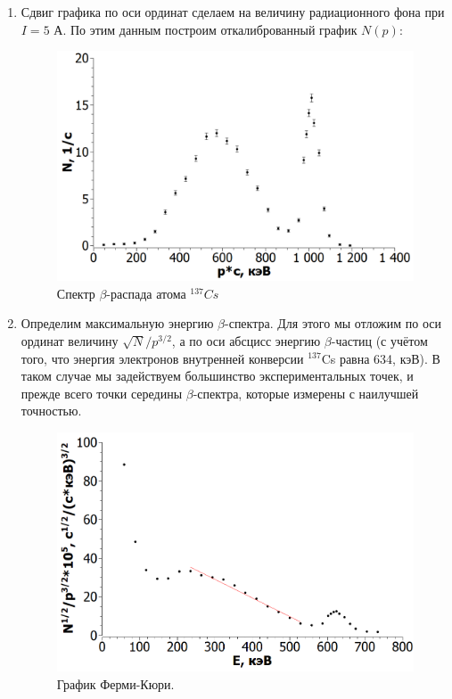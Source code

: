 \documentclass[a4paper, 12pt]{article}%
\begin{document}
\begin{enumerate}
\item Сдвиг графика по оси ординат сделаем на величину радиационного фона при $I = 5$ А. По этим данным построим откалиброванный график $N(p)$:

\begin{figure}[h]
    \centering
    \includegraphics[width=0.8\linewidth]{graph_2.PNG}
    \caption{Спектр $\beta$-распада атома $^{137}Cs$}
    \label{fig:graph_2}
\end{figure}

\item Определим максимальную энергию $\beta$-спектра. Для этого мы отложим по оси ординат величину $\sqrt{N}/p^{3/2}$, а по оси абсцисс энергию $\beta$-частиц (с учётом того, что энергия электронов внутренней конверсии $^{137}$Cs равна 634, кэВ). В таком случае мы задействуем большинство экспериментальных точек, и прежде всего точки середины $\beta$-спектра, которые измерены с наилучшей точностью.

\begin{figure}[h]
    \centering
    \includegraphics[width=0.8\linewidth]{graph_3.PNG}
    \caption{График Ферми-Кюри.}
    \label{fig:graph_2}
\end{figure}


\end{enumerate}
\end{document}

